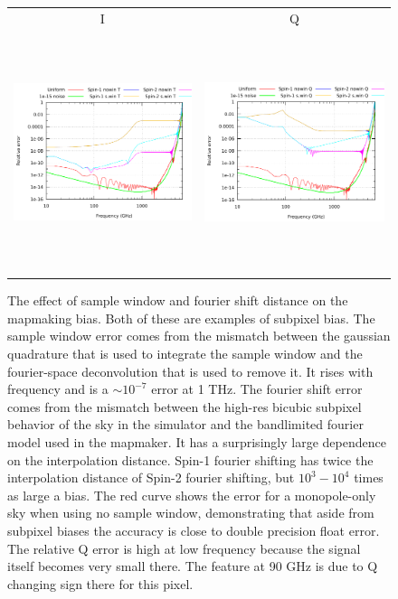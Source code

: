 \documentclass{article}
\begin{document}
\begin{figure}
	\centering
	\hspace*{-2mm}\begin{tabular}{cc}
		I & Q \\
		\includegraphics[height=70mm,clip,trim=0 0 0 0]{plots/spec_error_rel_v4_log_log_spin_win_T.pdf} &
		\includegraphics[height=70mm,clip,trim=30mm 0 0 0]{plots/spec_error_rel_v4_log_log_spin_win_Q.pdf}
	\end{tabular}
	\caption{The effect of sample window and fourier shift distance on the
	mapmaking bias. Both of these are examples of subpixel bias. The sample
	window error comes from the mismatch between the gaussian quadrature that is
	used to integrate the sample window and the fourier-space deconvolution that
	is used to remove it. It rises with frequency and is a $\sim 10^{-7}$ error
	at 1 THz. The fourier shift error comes from the mismatch between the
	high-res bicubic subpixel behavior of the sky in the simulator and the
	bandlimited fourier model used in the mapmaker. It has a surprisingly large
	dependence on the interpolation distance. Spin-1 fourier shifting has
	twice the interpolation distance of Spin-2 fourier shifting, but $10^3-10^4$
	times as large a bias. The red curve shows the error for a
	monopole-only sky when using no sample window, demonstrating
	that aside from subpixel biases the accuracy is close to double
	precision float error.
	The relative Q error is high at low frequency because the signal itself
	becomes very small there. The feature at 90 GHz is due to Q changing
	sign there for this pixel.
	}
\end{figure}
\end{document}
